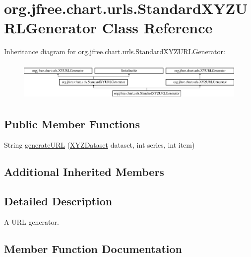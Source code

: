 \hypertarget{classorg_1_1jfree_1_1chart_1_1urls_1_1_standard_x_y_z_u_r_l_generator}{}\section{org.\+jfree.\+chart.\+urls.\+Standard\+X\+Y\+Z\+U\+R\+L\+Generator Class Reference}
\label{classorg_1_1jfree_1_1chart_1_1urls_1_1_standard_x_y_z_u_r_l_generator}
Inheritance diagram for org.\+jfree.\+chart.\+urls.\+Standard\+X\+Y\+Z\+U\+R\+L\+Generator\+:\begin{figure}[H]
\begin{center}
\leavevmode
\includegraphics[height=1.937716cm]{classorg_1_1jfree_1_1chart_1_1urls_1_1_standard_x_y_z_u_r_l_generator}
\end{center}
\end{figure}
\subsection*{Public Member Functions}
\begin{DoxyCompactItemize}
\item 
String \mbox{\hyperlink{classorg_1_1jfree_1_1chart_1_1urls_1_1_standard_x_y_z_u_r_l_generator_ab3e12806a1270dc1c1d750776c7680e8}{generate\+U\+RL}} (\mbox{\hyperlink{interfaceorg_1_1jfree_1_1data_1_1xy_1_1_x_y_z_dataset}{X\+Y\+Z\+Dataset}} dataset, int series, int item)
\end{DoxyCompactItemize}
\subsection*{Additional Inherited Members}


\subsection{Detailed Description}
A U\+RL generator. 

\subsection{Member Function Documentation}
\mbox{\label{classorg_1_1jfree_1_1chart_1_1urls_1_1_standard_x_y_z_u_r_l_generator_ab3e12806a1270dc1c1d750776c7680e8}} 
